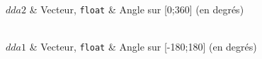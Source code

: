 \begin{tabarg}
\\
\hline
$dda2$ & Vecteur, \texttt {float} & Angle sur [0;360]  (en degr\'es) \\
\end{tabarg}

\medskip
\begin{tabarg}
\\
\hline
$dda1$ & Vecteur, \texttt {float} & Angle sur [-180;180] (en degr\'es) \\
\end{tabarg}

